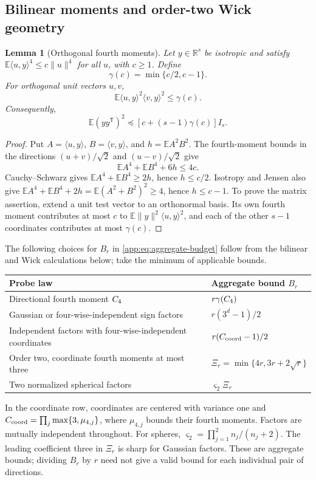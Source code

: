 \documentclass[11pt,a4paper]{article}
\newtheorem{lemma}[theorem]{Lemma}
\theoremstyle{definition}\newtheorem{definition}[theorem]{Definition}
\theoremstyle{remark}\newtheorem{remark}[theorem]{Remark}
\numberwithin{equation}{section}
\newcommand{\R}{\mathbb R}\newcommand{\E}{\mathbb E}\newcommand{\Pp}{\mathbb P}
\newcommand{\norm}[1]{\lVert#1\rVert}\newcommand{\ip}[2]{\langle#1,#2\rangle}
\begin{document}
\subsection{Bilinear moments and order-two Wick geometry}\label{appendix:wick}

\begin{lemma}[Orthogonal fourth moments]\label{core:lem:orthogonal-fourth}
Let $y\in\R^s$ be isotropic and satisfy
$\E\ip uy^4\le c\norm u^4$ for all $u$, with $c\ge1$. Define
\begin{equation}\label{core:eq:orthogonal-gamma}
 \gamma(c)=\min\{c/2,c-1\}.
\end{equation}
For orthogonal unit vectors $u,v$,
\begin{equation}\label{core:eq:orthogonal-fourth}
 \E\ip uy^2\ip vy^2\le\gamma(c).
\end{equation}
Consequently,
\begin{equation}\label{core:eq:orthogonal-variance}
 \E(yy^{\mathsf T})^2\preceq
 [c+(s-1)\gamma(c)]I_s.
\end{equation}
\end{lemma}
\begin{proof}
Put $A=\ip uy$, $B=\ip vy$, and $h=\E A^2B^2$.
The fourth-moment bounds in the directions $(u+v)/\sqrt2$ and
$(u-v)/\sqrt2$ give
\[
 \E A^4+\E B^4+6h\le4c.
\]
Cauchy--Schwarz gives $\E A^4+\E B^4\ge2h$, hence $h\le c/2$.
Isotropy and Jensen also give
$\E A^4+\E B^4+2h=\E(A^2+B^2)^2\ge4$, hence $h\le c-1$.
To prove the matrix assertion, extend a unit test vector to an
orthonormal basis. Its own fourth moment contributes at most $c$ to
$\E\norm y^2\ip uy^2$, and each of the other $s-1$ coordinates
contributes at most $\gamma(c)$.
\end{proof}
The following choices for $B_r$ in \eqref{app:eq:aggregate-budget}
follow from the bilinear and Wick calculations below; take the minimum
of applicable bounds.
\begin{center}\small
\begin{tabularx}{\linewidth}{@{}Yl@{}}
\toprule Probe law & Aggregate bound $B_r$\\\midrule
Directional fourth moment ${C_4}$ & $r\gamma({C_4})$\\
Gaussian or four-wise-independent sign factors & $r(3^d-1)/2$\\
Independent factors with four-wise-independent coordinates & $r(C_{\rm coord}-1)/2$\\
Order two, coordinate fourth moments at most three & $\Xi_r=\min\{4r,3r+2\sqrt r\}$\\
Two normalized spherical factors & $\varsigma_2\Xi_r$\\
\bottomrule
\end{tabularx}
\end{center}
In the coordinate row, coordinates are centered with variance one and
$C_{\rm coord}=\prod_j\max\{3,\mu_{4,j}\}$, where $\mu_{4,j}$ bounds
their fourth moments. Factors are mutually independent throughout.
For spheres, $\varsigma_2=\prod_{j=1}^2n_j/(n_j+2)$.
The leading coefficient three in $\Xi_r$ is sharp for Gaussian factors.
These are aggregate bounds; dividing $B_r$ by $r$ need not give a
valid bound for each individual pair of directions.
\end{document}
